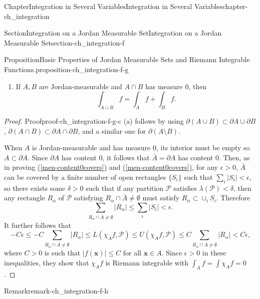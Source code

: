 \documentclass[oneside,10pt,]{book}
\newcommand{\xreffont}{\relax}
\numberwithin{equation}{section}
\newcommand{\bx}{\mathbf{x}}
\newcommand{\cP}{\mathcal{P}}
\newcommand{\lt}{<}
\begin{document}
\begin{chapterptx}{Chapter}{Integration in Several Variables}{}{Integration in Several Variables}{}{}{chapter-ch_integration}
\begin{sectionptx}{Section}{Integration on a Jordan Measurable Set}{}{Integration on a Jordan Measurable Set}{}{}{section-ch_integration-f}
\begin{proposition}{Proposition}{Basic Properties of Jordan Measurable Sets and Riemann Integrable Functions.}{}{proposition-ch_integration-f-g}
\begin{enumerate}[label=(\alph*)]
\begin{equation*}
\int_{A}\left(a f+b g \right)=a \int_{A} f + b \int_{A} g.
\end{equation*}
%
\item{}If \(A, B\) are Jordan-measurable and \(A\cap B\) has measure \(0\), then%
\begin{equation*}
\int_{A\cup B}f= \int_{A}f +\int_{B}f\text{.}
\end{equation*}
%
\end{enumerate}
\end{proposition}
\begin{proof}{Proof}{}{proof-ch_integration-f-g-c}
(a) follows by using \(\partial (A\cup B)\subset \partial A \cup \partial B\), \(\partial (A\cap B)\subset \partial A \cap \partial B\), and a similar one for \(\partial (A\setminus B)\).%
\par
When \(A\) is Jordan-measurable and has measure \(0\), its interior must be empty so \(A\subset \partial A\). Since \(\partial A\) has content \(0\), it follows that \(\bar A=\partial A\) has content \(0\). Then, as in proving \hyperref[men-content0covers]{({\xreffont\ref{men-content0covers}})} and \hyperref[men-content0covers]{({\xreffont\ref{men-content0covers}})}, for any \(\epsilon >0\), \(\bar A\) can be covered by a finite number of open rectangles \(\{ S_{i} \}\) such that \(\sum_{i}|S_{i}| \lt \epsilon\), so there exists some \(\delta >0\) such that if any partition \(\cP\) satisfies \(\lambda (\cP) \lt \delta\), then any rectangle \(R_{\alpha}\) of \(\cP\) satisfying \(R_{\alpha} \cap \bar A \ne \emptyset\) must satisfy \(R_{\alpha} \subset \cup_{i} S_{i}\). Therefore%
\begin{equation*}
\sum_{R_{\alpha} \cap \bar A \ne \emptyset} |R_{\alpha} | \le \sum_{i}|S_{i}| \lt \epsilon\text{.}
\end{equation*}
It further follows that%
\begin{equation*}
- C \epsilon \le 
- C \sum_{R_{\alpha} \cap \bar A \ne \emptyset} |R_{\alpha} |\le 
L(\chi_{A}f, \cP)\le U(\chi_{A}f, \cP) \le C \sum_{R_{\alpha} \cap \bar A \ne \emptyset} |R_{\alpha} |
\lt C \epsilon\text{,}
\end{equation*}
where \(C>0\) is such that \(| f(\bx) |\le C\) for all \(\bx \in A\). Since \(\epsilon >0\) in these inequalities, they show that \(\chi_{A}f\) is Riemann integrable with \(\int_{A}f=\int \chi_{A}f =0\).%
\end{proof}
\begin{remark}{Remark}{}{remark-ch_integration-f-h}%

\end{remark}
\end{sectionptx}
\end{chapterptx}
\end{document}
